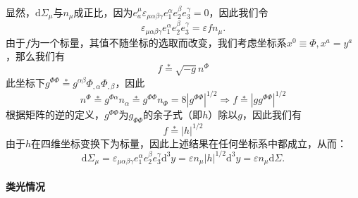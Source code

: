 \documentclass[hyperref, UTF8, a4paper]{ctexart}
\begin{document}
显然，$\mathrm{d} \Sigma _{\mu }$与$n_{\mu }$成正比，因为$e_{a}^{\mu } \varepsilon _{\mu \alpha \beta \gamma } e_{1}^{\alpha } e_{2}^{\beta } e_{3}^{\gamma } =0$，因此我们令
\begin{equation*}
	\varepsilon _{\mu \alpha \beta \gamma } e_{1}^{\alpha } e_{2}^{\beta } e_{3}^{\gamma } =\varepsilon fn_{\mu } .
\end{equation*}
由于$f$为一个标量，其值不随坐标的选取而改变，我们考虑坐标系$x^{0} \equiv \Phi ,x^{a} =y^{a}$，那么我们有
\begin{equation*}
	f\stackrel{*}{=}\sqrt{-g} n^{\Phi }
\end{equation*}
此坐标下$g^{\Phi \Phi }\stackrel{*}{=} g^{\alpha \beta } \Phi _{,\alpha } \Phi _{,\beta }$，因此
\begin{equation*}
	n^{\Phi }\stackrel{*}{=} g^{\Phi \alpha } n_{\alpha }\stackrel{*}{=} g^{\Phi \Phi } n_{\Phi } =8\left| g^{\Phi \Phi }\right| ^{1/2} \Rightarrow f\stackrel{*}{=}\left| gg^{\Phi \Phi }\right| ^{1/2}
\end{equation*}
根据矩阵的逆的定义，$g^{\Phi \Phi }$为$g_{\Phi \Phi }$的余子式（即$h$）除以$g$，因此我们有
\begin{equation*}
	f\stackrel{*}{=}| h| ^{1/2}
\end{equation*}
由于$h$在四维坐标变换下为标量，因此上述结果在任何坐标系中都成立，从而：
\begin{equation*}
	\mathrm{d} \Sigma _{\mu } =\varepsilon _{\mu \alpha \beta \gamma } e_{1}^{\alpha } e_{2}^{\beta } e_{3}^{\gamma }\mathrm{d}^{3} y=\varepsilon n_{\mu }| h| ^{1/2}\mathrm{d}^{3} y=\varepsilon n_{\mu }\mathrm{d} \Sigma .
\end{equation*}

\paragraph{类光情况}
\end{document}
